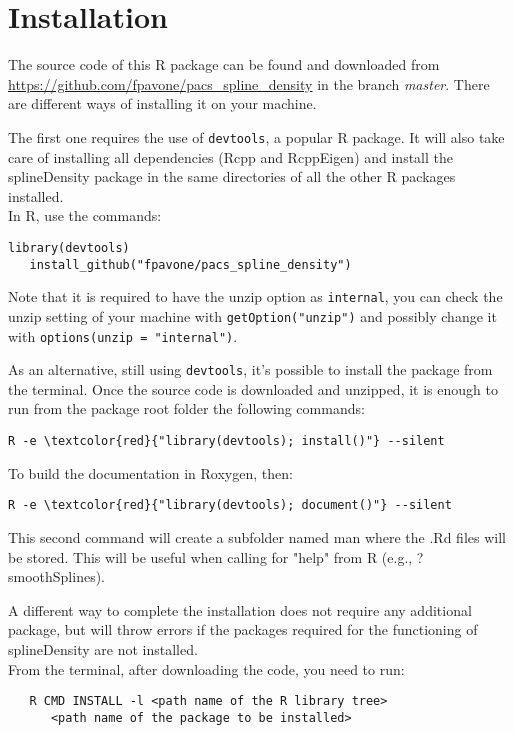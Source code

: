 \chapter{Installation}
\label{installation}

\noindent 
The source code of this R package can be found and downloaded from \url{https://github.com/fpavone/pacs_spline_density} in the branch \textit{master}. 
There are different ways of installing it on your machine.

The first one requires the use of \verb|devtools|, a popular R package. It will also take care of installing all dependencies (Rcpp and RcppEigen) and install the splineDensity package in the same directories of all the other R packages installed.  \\
In R, use the commands: 
\begin{Verbatim}[commandchars=\\\{\}]
   library(devtools)
   install_github("fpavone/pacs_spline_density")
\end{Verbatim}
Note that it is required to have the unzip option as \verb|internal|, you can check the unzip setting of your machine with \verb|getOption("unzip")| and possibly change it with \verb|options(unzip = "internal")|.

As an alternative, still using \verb|devtools|, it's possible to install the package from the terminal.
Once the source code is downloaded and unzipped, it is enough to run from the package root folder the following commands:
\begin{Verbatim}[commandchars=\\\{\}]
   R -e \textcolor{red}{"library(devtools); install()"} --silent
\end{Verbatim}
To build the documentation in Roxygen, then:
\begin{Verbatim}[commandchars=\\\{\}]
   R -e \textcolor{red}{"library(devtools); document()"} --silent
\end{Verbatim}
This second command will create a subfolder named man where the .Rd files will be stored. This will be useful when calling for "help" from R (e.g., ?smoothSplines).

A different way to complete the installation does not require any additional package, but will throw errors if the packages required for the functioning of splineDensity are not installed. \\
From the terminal, after downloading the code, you need to run:
\begin{verbatim}
   R CMD INSTALL -l <path name of the R library tree> 
      <path name of the package to be installed>
\end{verbatim}

